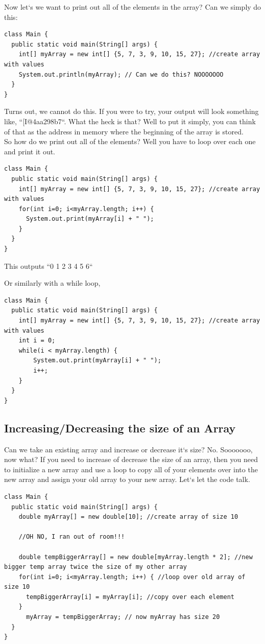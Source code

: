 \documentclass[11]{article}
\begin{document}
Now let`s we want to print out all of the elements in the array? Can we simply do this:

\begin{lstlisting}
class Main {
  public static void main(String[] args) {
    int[] myArray = new int[] {5, 7, 3, 9, 10, 15, 27}; //create array with values
	System.out.println(myArray); // Can we do this? NOOOOOOO
  }
}
\end{lstlisting}

Turns out, we cannot do this. If you were to try, your output will look something like, ``[I@4aa298b7``. What the heck is that? Well to put it simply, you can think of that as the address in memory where the beginning of the array is stored.\\

So how do we print out all of the elements? Well you have to loop over each one and print it out.

\begin{lstlisting}
class Main {
  public static void main(String[] args) {
    int[] myArray = new int[] {5, 7, 3, 9, 10, 15, 27}; //create array with values
    for(int i=0; i<myArray.length; i++) {
      System.out.print(myArray[i] + " ");
    }
  }
}
\end{lstlisting}

This outputs ``0 1 2 3 4 5 6``

Or similarly with a while loop,
\begin{lstlisting}
class Main {
  public static void main(String[] args) {
    int[] myArray = new int[] {5, 7, 3, 9, 10, 15, 27}; //create array with values
    int i = 0;
	while(i < myArray.length) {
		System.out.print(myArray[i] + " ");
		i++;	
	}    
  }
}
\end{lstlisting}
\subsection{Increasing/Decreasing the size of an Array}
Can we take an existing array and increase or decrease it`s size? No. Sooooooo, now what? If you need to increase of decrease the size of an array, then you need to initialize a new array and use a loop to copy all of your elements over into the new array and assign your old array to your new array. Let`s let the code talk.

\begin{lstlisting}
class Main {
  public static void main(String[] args) {
    double myArray[] = new double[10]; //create array of size 10

    //OH NO, I ran out of room!!!

    double tempBiggerArray[] = new double[myArray.length * 2]; //new bigger temp array twice the size of my other array
    for(int i=0; i<myArray.length; i++) { //loop over old array of size 10
      tempBiggerArray[i] = myArray[i]; //copy over each element
    }
      myArray = tempBiggerArray; // now myArray has size 20
  }
}
\end{lstlisting}
\end{document}
